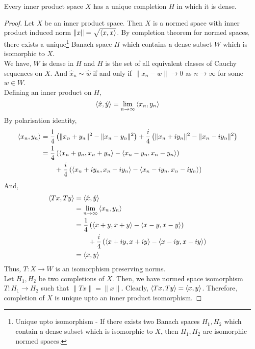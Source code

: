 \begin{theorem}
	Every inner product space $X$ has a unique completion $H$ in which it is dense.
\end{theorem}
\begin{proof}
	Let $X$ be an inner product space.
	Then $X$ is a normed space with inner product induced norm $\|x\| = \sqrt{\left\langle x,x \right\rangle}$.
	By completion theorem for normed spaces, there exists a unique\dag\footnote{
		Unique upto isomorphism - 
		If there exists two Banach spaces $H_1,H_2$ which contain a dense subset which is isomorphic to $X$, then $H_1,H_2$ are isomorphic normed spaces.} 
	Banach space $H$ which contains a dense subset $W$ which is isomorphic to $X$.\\
	
	We have, $W$ is dense in $H$ and $H$ is the set of all equivalent classes of Cauchy sequences on $X$.
	And $\hat{x}_n \sim \hat{w}$ if and only if $\|x_n - w\| \to 0$ as $n \to \infty$ for some $w \in W$.\\

	Defining an inner product on $H$,
	\[ \left\langle \hat{x},\hat{y} \right\rangle = \lim_{n \to \infty} \left\langle x_n,y_n \right\rangle \]
	By polarisation identity, 
	\begin{align*}
		\left\langle x_n,y_n \right\rangle 
		& = \frac{1}{4} \left( \|x_n+y_n\|^2 - \|x_n-y_n\|^2 \right) + \frac{i}{4}\left( \|x_n+iy_n\|^2 - \|x_n-iy_n\|^2 \right) \\
		& = \frac{1}{4} \left( \left\langle x_n+y_n,x_n+y_n \right\rangle - \left\langle x_n-y_n,x_n-y_n \right\rangle \right) \\
		& \qquad + \frac{i}{4} \left( \left\langle x_n+iy_n,x_n+iy_n \right\rangle - \left\langle x_n-iy_n,x_n-iy_n \right\rangle \right) 
	\end{align*}
	And,
	\begin{align*}
		\left\langle Tx,Ty \right\rangle 
		& = \left\langle \hat{x},\hat{y} \right\rangle\\
		& = \lim_{n \to \infty} \left\langle x_n,y_n \right\rangle \\
		& = \frac{1}{4} \left( \left\langle x+y,x+y \right\rangle - \left\langle x-y,x-y \right\rangle \right) \\
		&\qquad + \frac{i}{4} \left( \left\langle x+iy,x+iy \right\rangle - \left\langle x-iy,x-iy \right\rangle \right)\\
		& = \left\langle x,y \right\rangle
	\end{align*}
	Thus, $T : X \to W$ is an isomorphism preserving norms.\\

	Let $H_1,H_2$ be two completions of $X$.
	Then, we have normed space isomorphism $T : H_1 \to H_2$ such that $\|Tx\| = \|x\|$.
	Clearly, $\left\langle Tx,Ty \right\rangle = \left\langle x,y \right\rangle$.
	Therefore, completion of $X$ is unique upto an inner product isomorphism.
\end{proof}

